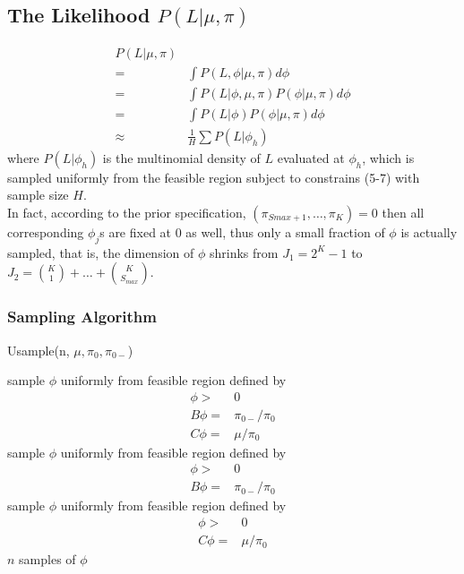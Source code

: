 \documentclass[11 pt, a4paper]{article}  %
\begin{document}
\subsection{The Likelihood $P(L|\mu, \pi)$}
\begin{align}
P(L | \mu, \pi) \nonumber \\ 
= & \int P(L, \phi | \mu, \pi) d \phi \nonumber \\ 
= & \int P(L | \phi, \mu, \pi) P(\phi | \mu,\pi) d \phi \nonumber \\ 
= & \int P(L | \phi) P(\phi | \mu,\pi) d \phi \nonumber \\ 
\approx & \frac{1}{H}\sum P(L | \phi_h) 
\end{align}
where $P(L | \phi_h)$ is the multinomial density of $L$ evaluated at $\phi_h$, which is sampled uniformly from the feasible region subject to constrains (5-7) with sample size $H$. \\

In fact, according to the prior specification, $(\pi_{Smax+1}, \ldots, \pi_K)=0$ then all corresponding $\phi_j$s are fixed at $0$ as well, thus only a small fraction of $\phi$ is actually sampled, that is, the dimension of $\phi$ shrinks from $J_1 = 2^K-1$ to $J_2={K \choose 1} + \ldots + {K \choose S_{max}}$.\\

\newpage

\subsubsection{Sampling Algorithm}
\begin{algorithm}[H]
\caption{Usample(n, $\mu, \pi_0, \pi_{0-}$)}
\begin{algorithmic}[1]
\State sample $\phi$ uniformly from feasible region defined by 
\begin{align*}
\phi > & 0\\
B \phi = & \pi_{0-}/\pi_0\\ 
C \phi = & \mu/\pi_0
\end{align*}
\State sample $\phi$ uniformly from feasible region defined by 
\begin{align*}
\phi > & 0\\
B \phi = & \pi_{0-}/\pi_0
\end{align*}
\Else
\State sample $\phi$ uniformly from feasible region defined by 
\begin{align*}
\phi > & 0\\
C \phi = & \mu/\pi_0
\end{align*}
\EndIf
{} $n$ samples of $\phi$
\end{algorithmic}
\end{algorithm}
\end{document}
